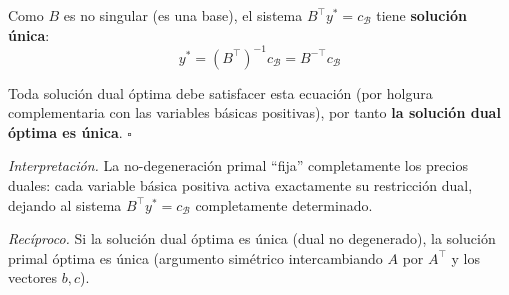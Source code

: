 \documentclass{article}
\begin{document}
\begin{enumerate}[a)]
Como $B$ es no singular (es una base), el sistema $B^\top y^*=c_\mathcal{B}$ tiene \textbf{solución única}:
$$y^* = (B^\top)^{-1}c_\mathcal{B} = B^{-\top}c_\mathcal{B}$$

Toda solución dual óptima debe satisfacer esta ecuación (por holgura complementaria con las variables básicas positivas), por tanto \textbf{la solución dual óptima es única}. $\square$

\textit{Interpretación.} La no-degeneración primal ``fija'' completamente los precios duales: cada variable básica positiva activa exactamente su restricción dual, dejando al sistema $B^\top y^*=c_\mathcal{B}$ completamente determinado.

\textit{Recíproco.} Si la solución dual óptima es única (dual no degenerado), la solución primal óptima es única (argumento simétrico intercambiando $A$ por $A^\top$ y los vectores $b,c$).

\end{enumerate}
\end{document}
